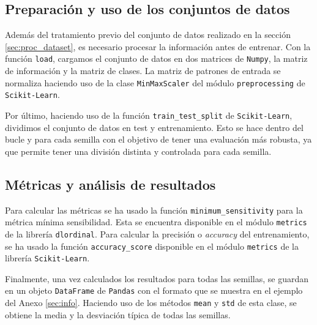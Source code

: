\subsection{Preparación y uso de los conjuntos de datos}
\label{subsec:datos_experimentales}

Además del tratamiento previo del conjunto de datos realizado en la sección \ref{sec:proc_dataset}, es necesario procesar la información antes de entrenar. Con la función \texttt{load}, cargamos el conjunto de datos en dos matrices de \texttt{Numpy}, la matriz de información y la matriz de clases. La matriz de patrones de entrada se normaliza haciendo uso de la clase \texttt{MinMaxScaler} del módulo \texttt{preprocessing} de \texttt{Scikit-Learn}.

\vspace{1em}

Por último, haciendo uso de la función \texttt{train\_test\_split} de \texttt{Scikit-Learn}, dividimos el conjunto de datos en test y entrenamiento. Esto se hace dentro del bucle y para cada semilla con el objetivo de tener una evaluación más robusta, ya que permite tener una división distinta y controlada para cada semilla.

\subsection{Métricas y análisis de resultados}
\label{subsec:metricas_pruebas}

Para calcular las métricas se ha usado la función \texttt{minimum\_sensitivity} para la métrica mínima sensibilidad. Esta se encuentra disponible en el módulo \texttt{metrics} de la librería \texttt{dlordinal}. Para calcular la precisión o \textit{accuracy} del entrenamiento, se ha usado la función \texttt{accuracy\_score} disponible en el módulo \texttt{metrics} de la librería \texttt{Scikit-Learn}.

\vspace{1em}

Finalmente, una vez calculados los resultados para todas las semillas, se guardan en un objeto \texttt{DataFrame} de \texttt{Pandas} con el formato que se muestra en el ejemplo del Anexo \ref{sec:info}. Haciendo uso de los métodos \texttt{mean} y \texttt{std} de esta clase, se obtiene la media y la desviación típica de todas las semillas.
